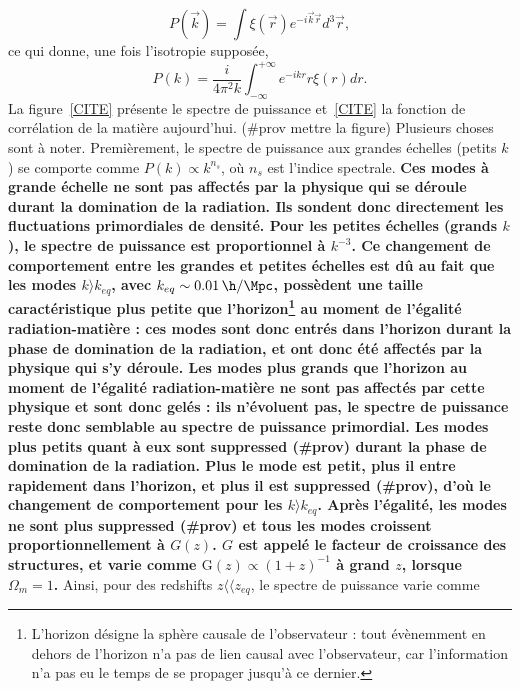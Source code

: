 \documentclass[11pt, twoside, a4paper, openright]{report}
\begin{document}
\begin{equation}
  \label{eq:cf_tf}
  P(\vec{k}) = \int \xi(\vec{r}) e^{- i \vec{k} \vec{r}} d^3\vec{r} ,
\end{equation}
ce qui donne, une fois l'isotropie supposée,
\begin{equation}
  \label{eq:cf_tf2}
  P(k) = \frac{i}{4 \pi^2 k} \int_{-\infty}^{+\infty} e^{- i k r} r \xi(r) dr .
\end{equation}
La figure~\ref{CITE} présente le spectre de puissance et~\ref{CITE} la fonction de corrélation de la matière aujourd'hui. (\#prov mettre la figure)
Plusieurs choses sont à noter. Premièrement, le spectre de puissance aux grandes échelles (petits $k$) se comporte comme $P(k) \propto k^{n_s}$, où $n_s$ est l'indice spectrale.
\textbf{Ces modes à grande échelle ne sont pas affectés par la physique qui se déroule durant la domination de la radiation. Ils sondent donc directement les fluctuations primordiales de densité.
Pour les petites échelles (grands $k$), le spectre de puissance est proportionnel à $k^{-3}$. Ce changement de comportement entre les grandes et petites échelles est dû au fait que les modes $k \rangle k_{eq}$, avec  $k_{eq} \sim \SI{0.01}{\h\per\Mpc}$, possèdent une taille caractéristique plus petite que l'horizon\footnote{L'horizon désigne la sphère causale de l'observateur : tout évènemment en dehors de l'horizon n'a pas de lien causal avec l'observateur, car l'information n'a pas eu le temps de se propager jusqu'à ce dernier.} au moment de l'égalité radiation-matière : ces modes sont donc entrés dans l'horizon durant la phase de domination de la radiation, et ont donc été affectés par la physique qui s'y déroule.
Les modes plus grands que l'horizon au moment de l'égalité radiation-matière ne sont pas affectés par cette physique et sont donc gelés : ils n'évoluent pas, le spectre de puissance reste donc semblable au spectre de puissance primordial.
Les modes plus petits quant à eux sont suppressed (\#prov) durant la phase de domination de la radiation. Plus le mode est petit, plus il entre rapidement dans l'horizon, et plus il est suppressed (\#prov), d'où le changement de comportement pour les $k \rangle k_{eq}$. Après l'égalité, les modes ne sont plus suppressed (\#prov) et tous les modes croissent proportionnellement à $G(z)$. 
$G$ est appelé le facteur de croissance des structures, et varie comme $\mathrm{G}(z) \propto (1+z)^{-1}$ à grand $z$, lorsque $\Omega_m = 1$.} Ainsi, pour des redshifts $z \langle\langle z_{eq}$, le spectre de puissance varie comme
\end{document}
